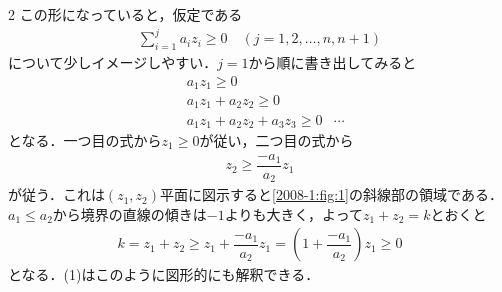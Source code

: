 \documentclass[../../main.tex]{subfiles}
\begin{document}
\begin{multicols}{2}
  この形になっていると，仮定である
  \begin{align}
    \sum_{i=1}^j a_i z_i \ge 0 \quad (j=1, 2, \dots, n,n+1)
  \end{align}
  について少しイメージしやすい．$j=1$から順に書き出してみると
  \begin{align}
    & a_1 z_1 \ge 0                     \\
    & a_1 z_1 + a_2 z_2 \ge 0           \\
    & a_1 z_1 + a_2 z_2 + a_3 z_3 \ge 0
    & \cdots
  \end{align}
  となる．一つ目の式から$z_1 \ge 0$が従い，二つ目の式から
  \begin{align}
    z_2 \ge \dfrac{-a_1}{a_2} z_1
  \end{align}
  が従う．これは$(z_1,z_2)$平面に図示すると\cref{2008-1:fig:1}の斜線部の領域である．
  $a_1 \le a_2$から境界の直線の傾きは$-1$よりも大きく，よって$z_1+z_2=k$とおくと
  \begin{align}
    k = z_1 + z_2 \ge z_1 + \dfrac{-a_1}{a_2} z_1 = \left(1+\dfrac{-a_1}{a_2}\right) z_1 \ge 0
  \end{align}
  となる．(1)はこのように図形的にも解釈できる．

  \begin{figure}[H]
    \centering
\end{figure}
\end{multicols}
\end{document}
